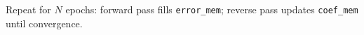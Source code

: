 \documentclass[preview]{standalone}
\begin{document}
\begin{center}
Repeat for $N$ epochs: forward pass fills \texttt{error\_mem}; reverse pass updates \texttt{coef\_mem} until convergence.
\end{center}
\end{document}
